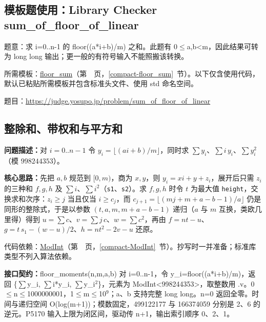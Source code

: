

\Needspace{322pt}

\subsection*{模板题使用：Library Checker sum\_of\_floor\_of\_linear}

\label{usage-example-14}

题意：求 i=0..n-1 的 floor((a*i+b)/m) 之和。此题有 0$\le$a,b<m，因此结果可转为 long long 输出；更一般的有符号输入不能照搬该转换。

所需模板：\hyperref[compact-floor_sum]{floor\_\allowbreak{}sum}（第~\pageref{compact-floor_sum}~页，\ref{compact-floor_sum}~节）。以下仅含使用代码，默认已粘贴所需模板并包含标准头文件、使用 std 命名空间。

题目：\url{https://judge.yosupo.jp/problem/sum_of_floor_of_linear}



\Needspace{599pt}

\subsection{整除和、带权和与平方和}\label{compact-floor_moments}

\noindent\textbf{问题描述：}\allowbreak 对 $i=0..n-1$ 令 $y_i=\lfloor(ai+b)/m\rfloor$，同时求 $\sum y_i$、$\sum i\,y_i$、$\sum y_i^2$（模 $998244353$）。

\textbf{核心思路：}\allowbreak 先把 $a,b$ 规范到 $[0,m)$，商为 $x,y$，则 $y_i=xi+y+z_i$，展开后只需 $z_i$ 的三种和 $f,g,h$ 及 $\sum i$、$\sum i^2$（\texttt{s1}、\texttt{s2}）。求 $f,g,h$ 时令 $t$ 为最大值 \texttt{height}，交换求和次序：$z_i\ge j$ 当且仅当 $i\ge c_j$，而 $c_{j+1}=\lfloor(mj+m+a-b-1)/a\rfloor$ 仍是同形的整除式，于是以参数 $(t,a,m,m+a-b-1)$ 递归（$a$ 与 $m$ 互换，类欧几里得）得到 $u=\sum c$、$v=\sum j\,c$、$w=\sum c^2$，再由 $f=nt-u$、$g=t\,s_1-(w-u)/2$、$h=nt^2-2v-u$ 还原。

代码依赖：\hyperref[compact-ModInt]{ModInt}（第~\pageref{compact-ModInt}~页，\ref{compact-ModInt}~节）。抄写时一并准备；标准库类型不列入算法依赖。

{\sloppy{}\noindent\textbf{接口契约：}floor\_moments(n,m,a,b) 对 i=0..n-1，令 y\_i=floor((a*i+b)/m)，返回 \{$\sum$y\_i, $\sum$i*y\_i, $\sum$y\_i$^{2}$\}，元素为 ModInt<998244353>，取整数用 .v。0$\le$n$\le$1000000001，1$\le$m$\le$10$^{9}$；a、b 支持完整 long long。n=0 返回全零。时间与递归空间 O(log(m+1))；模数固定，499122177 与 166374059 分别是 2、6 的逆元。P5170 输入上限为闭区间，驱动传 n+1，输出索引顺序 0、2、1。\par}

